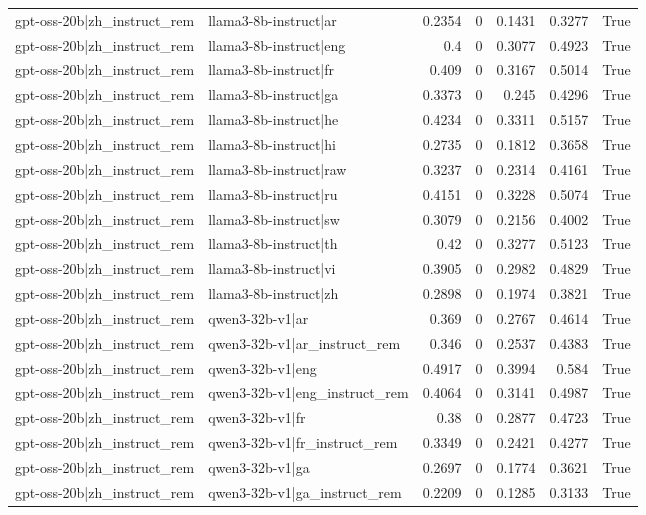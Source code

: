 \begin{table}
\begin{tabular}{l l r r r r l}
gpt-oss-20b|zh_instruct_rem & llama3-8b-instruct|ar & 0.2354 & 0 & 0.1431 & 0.3277 & True \\
gpt-oss-20b|zh_instruct_rem & llama3-8b-instruct|eng & 0.4 & 0 & 0.3077 & 0.4923 & True \\
gpt-oss-20b|zh_instruct_rem & llama3-8b-instruct|fr & 0.409 & 0 & 0.3167 & 0.5014 & True \\
gpt-oss-20b|zh_instruct_rem & llama3-8b-instruct|ga & 0.3373 & 0 & 0.245 & 0.4296 & True \\
gpt-oss-20b|zh_instruct_rem & llama3-8b-instruct|he & 0.4234 & 0 & 0.3311 & 0.5157 & True \\
gpt-oss-20b|zh_instruct_rem & llama3-8b-instruct|hi & 0.2735 & 0 & 0.1812 & 0.3658 & True \\
gpt-oss-20b|zh_instruct_rem & llama3-8b-instruct|raw & 0.3237 & 0 & 0.2314 & 0.4161 & True \\
gpt-oss-20b|zh_instruct_rem & llama3-8b-instruct|ru & 0.4151 & 0 & 0.3228 & 0.5074 & True \\
gpt-oss-20b|zh_instruct_rem & llama3-8b-instruct|sw & 0.3079 & 0 & 0.2156 & 0.4002 & True \\
gpt-oss-20b|zh_instruct_rem & llama3-8b-instruct|th & 0.42 & 0 & 0.3277 & 0.5123 & True \\
gpt-oss-20b|zh_instruct_rem & llama3-8b-instruct|vi & 0.3905 & 0 & 0.2982 & 0.4829 & True \\
gpt-oss-20b|zh_instruct_rem & llama3-8b-instruct|zh & 0.2898 & 0 & 0.1974 & 0.3821 & True \\
gpt-oss-20b|zh_instruct_rem & qwen3-32b-v1|ar & 0.369 & 0 & 0.2767 & 0.4614 & True \\
gpt-oss-20b|zh_instruct_rem & qwen3-32b-v1|ar_instruct_rem & 0.346 & 0 & 0.2537 & 0.4383 & True \\
gpt-oss-20b|zh_instruct_rem & qwen3-32b-v1|eng & 0.4917 & 0 & 0.3994 & 0.584 & True \\
gpt-oss-20b|zh_instruct_rem & qwen3-32b-v1|eng_instruct_rem & 0.4064 & 0 & 0.3141 & 0.4987 & True \\
gpt-oss-20b|zh_instruct_rem & qwen3-32b-v1|fr & 0.38 & 0 & 0.2877 & 0.4723 & True \\
gpt-oss-20b|zh_instruct_rem & qwen3-32b-v1|fr_instruct_rem & 0.3349 & 0 & 0.2421 & 0.4277 & True \\
gpt-oss-20b|zh_instruct_rem & qwen3-32b-v1|ga & 0.2697 & 0 & 0.1774 & 0.3621 & True \\
gpt-oss-20b|zh_instruct_rem & qwen3-32b-v1|ga_instruct_rem & 0.2209 & 0 & 0.1285 & 0.3133 & True \\

\end{tabular}
\end{table}
